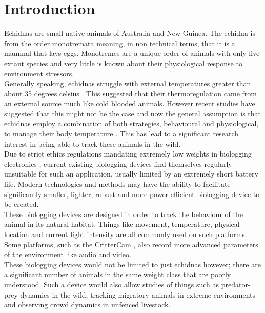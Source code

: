 \documentclass[12pt,openany,a4paper]{book}
\begin{document}
\chapter{Introduction}
Echidnas are small native animals of Australia and New Guinea. The echidna is from the order monotremata meaning, in non technical terms, that it is a mammal that lays eggs. Monotremes are a unique order of animals with only five extant species and very little is known about their physiological response to environment stressors.\\ 

Generally speaking, echidnas struggle with external temperatures greater than about 35 degrees celsius \cite{Brice02}. This suggested that their thermoregulation came from an external source much like cold blooded animals. However recent studies have suggested that this might not be the case and now the general assumption is that echidnas employ a combination of both strategies, behavioural and physiological, to manage their body temperature \cite{Brice02}. This has lead to a significant research interest in being able to track these animals in the wild.\\

Due to strict ethics regulations mandating extremely low weights in biologging electronics \cite{Mamm87}, current existing biologging devices find themselves regularly unsuitable for such an application, usually limited by an extremely short battery life. Modern technologies and methods may have the ability to facilitate significantly smaller, lighter, robust and more power efficient biologging device to be created. \\

These biologging devices are designed in order to track the behaviour of the animal in its natural habitat. Things like movement, temperature, physical location and current light intensity are all commonly used on such platforms. Some platforms, such as the CritterCam \cite{Marshall07}, also record more advanced parameters of the environment like audio and video. \\

These biologging devices would not be limited to just echidnas however; there are a significant number of animals in the same weight class that are poorly understood. Such a device would also allow studies of things such as predator-prey dynamics in the wild, tracking migratory animals in extreme environments and observing crowd dynamics in unfenced livestock. \\
\end{document}
